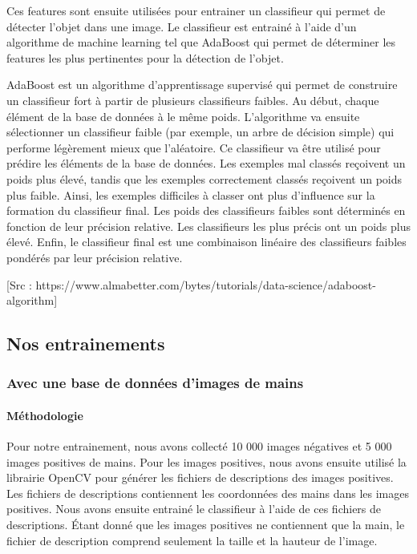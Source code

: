 \documentclass[11pt]{article}
\begin{document}
\bigbreak

Ces features sont ensuite utilisées pour entrainer un classifieur qui permet de détecter l'objet dans une image. Le classifieur est entrainé à l'aide d'un algorithme de machine learning tel que AdaBoost qui permet de déterminer les features les plus pertinentes pour la détection de l'objet. \bigbreak

AdaBoost est un algorithme d'apprentissage supervisé qui permet de construire un classifieur fort à partir de plusieurs classifieurs faibles.
Au début, chaque élément de la base de données à le même poids. L'algorithme va ensuite sélectionner un classifieur faible (par exemple, un arbre de décision simple) qui performe légèrement mieux que l'aléatoire. Ce classifieur va être utilisé pour prédire les éléments de la base de données. Les exemples mal classés reçoivent un poids plus élevé, tandis que les exemples correctement classés reçoivent un poids plus faible. Ainsi, les exemples difficiles à classer ont plus d'influence sur la formation du classifieur final. Les poids des classifieurs faibles sont déterminés en fonction de leur précision relative. Les classifieurs les plus précis ont un poids plus élevé. Enfin, le classifieur final est une combinaison linéaire des classifieurs faibles pondérés par leur précision relative. \bigbreak


[Src : https://www.almabetter.com/bytes/tutorials/data-science/adaboost-algorithm]

\subsection{Nos entrainements}
\subsubsection{Avec une base de données d'images de mains}
\paragraph{Méthodologie}
Pour notre entrainement, nous avons collecté 10 000 images négatives et 5 000 images positives de mains. Pour les images positives, nous avons ensuite utilisé la librairie OpenCV pour générer les fichiers de descriptions des images positives. Les fichiers de descriptions contiennent les coordonnées des mains dans les images positives. Nous avons ensuite entrainé le classifieur à l'aide de ces fichiers de descriptions. \'Etant donné que les images positives ne contiennent que la main, le fichier de description comprend seulement la taille et la hauteur de l'image. \bigbreak
\end{document}
